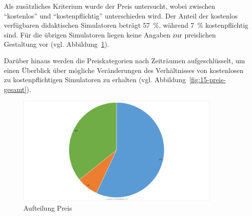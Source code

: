 Als zusätzliches Kriterium wurde der Preis untersucht, wobei zwischen \enquote{kostenlos} und \enquote{kostenpflichtig} unterschieden wird. Der Anteil der kostenlos verfügbaren didaktischen Simulatoren beträgt 57~\%, während 7~\% kostenpflichtig sind. Für die übrigen Simulatoren liegen keine Angaben zur preislichen Gestaltung vor (vgl. Abbildung~\ref{fig:14-preis2}). 

Darüber hinaus werden die Preiskategorien nach Zeiträumen aufgeschlüsselt, um einen Überblick über mögliche Veränderungen des Verhältnisses von kostenlosen zu kostenpflichtigen Simulatoren zu erhalten (vgl. Abbildung~\ref{fig:15-preis-gesamt}).

\begin{figure}[!htbp]
    \centering
    \includegraphics[width=0.9\textwidth]{graphics/14-preis3.png}
    \caption{Aufteilung Preis}
    \label{fig:14-preis2}
\end{figure}

